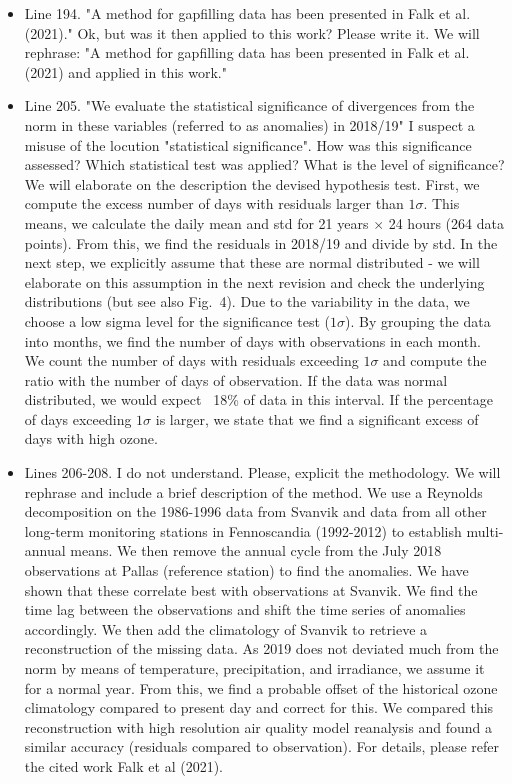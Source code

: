 \documentclass{scrartcl}
\begin{document}
\begin{itemize}
\item {\color{blue}Line 194. "A method for gapfilling data has been presented in Falk et al. (2021)."
Ok, but was it then applied to this work? Please write it.}
We will rephrase: "A method for gapfilling data has been presented in Falk et al. (2021) and applied in this work."

\item {\color{blue}Line 205. "We evaluate the statistical significance of divergences from the norm in these variables (referred to as anomalies) in 2018/19"
I suspect a misuse of the locution "statistical significance". How was this significance assessed? Which statistical test was applied? What is the level of significance?}
We will elaborate on the description the devised hypothesis test. First, we compute the excess number of days with residuals larger than $1\sigma$. This means, we calculate the daily mean and std for 21 years $\times$ 24 hours (264 data points).
From this, we find the residuals in 2018/19 and divide by std. In the next step, we explicitly assume that these are normal distributed - we will elaborate on this assumption in the next revision and check the underlying distributions (but see also Fig.~4). Due to the variability in the data, we choose a low sigma level for the significance test ($1\sigma$). By grouping the data into months, we find the number of days with observations in each month. We count the number of days with residuals exceeding $1\sigma$ and compute the ratio with the number of days of observation. If the data was normal distributed, we would expect ~18\% of data in this interval. If the percentage of days exceeding $1\sigma$ is larger, we state that we find a significant excess of days with high ozone.

\item {\color{blue}Lines 206-208. I do not understand. Please, explicit the methodology.}
We will rephrase and include a brief description of the method. We use a Reynolds decomposition on the 1986-1996 data from Svanvik and data from all other long-term monitoring stations in Fennoscandia (1992-2012) to establish multi-annual means. We then remove the annual cycle from the July 2018 observations at Pallas (reference station) to find the anomalies. We have shown that these correlate best with observations at Svanvik. We find the time lag between the observations and shift the time series of anomalies accordingly. We then add the climatology of Svanvik to retrieve a reconstruction of the missing data. As 2019 does not deviated much from the norm by means of temperature, precipitation, and irradiance, we assume it for a normal year. From this, we find a probable offset of the historical ozone climatology compared to present day and correct for this. We compared this reconstruction with high resolution air quality model reanalysis and found a similar accuracy (residuals compared to observation). For details, please refer the cited work Falk et al (2021).


\end{itemize}
\end{document}
